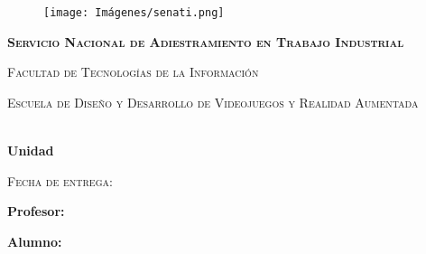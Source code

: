 \thispagestyle{empty}
			\begin{figure}[ht]
				\texttt{[image: Imágenes/senati.png]}
				\label{escudoTecNM}
		   \endminipage
		   \minipage{\textwidth}
				\label{EscudoITCJ}
			\endminipage
		\end{figure}
		
		\vspace{0.1cm}
		
		\begin{center}
		    {\scshape\LARGE \textbf{Servicio Nacional de Adiestramiento en Trabajo Industrial} \par}
			{\scshape\Large Facultad de Tecnologías de la Información \par}
			{\scshape\large Escuela de Diseño y Desarrollo de Videojuegos y Realidad Aumentada \par}
            \vspace{0.75cm}
             {\Large \textbf{\myMateria}}

			\begin{center}
			
			
			\vspace{0.75cm}
				
			{\LARGE\bfseries \MyReport\\Unidad \myUnidad\par}
            \vspace{0.75cm}
            
		{\scshape\Large Fecha de entrega: \myDate\par}	
        \vspace{0.75cm}
	    \LARGE	{ \textbf{Profesor:}}\\
        \large		{ \myTeacher}
        
		\vspace{0.5cm}	
		
		\LARGE	{ \textbf{Alumno:}}
        
        \normalsize	 {\myName}

				\vspace{1.25cm}
				\vspace{0.9cm}
				
			\end{center}
	
		\end{center}
